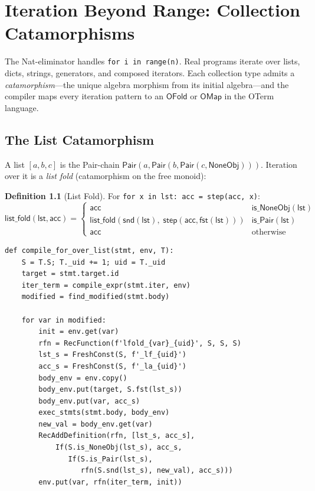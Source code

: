 \documentclass[11pt,a4paper]{report}
\theoremstyle{definition}
\newtheorem{definition}{Definition}[chapter]
\theoremstyle{plain}
\begin{document}
\chapter{Iteration Beyond Range: Collection Catamorphisms}
\label{ch:iteration-beyond}

The Nat-eliminator handles \texttt{for i in range(n)}.  Real programs
iterate over lists, dicts, strings, generators, and composed iterators.
Each collection type admits a \emph{catamorphism}---the unique algebra
morphism from its initial algebra---and the compiler maps every
iteration pattern to an $\mathsf{OFold}$ or $\mathsf{OMap}$ in the
OTerm language.

\section{The List Catamorphism}

A list $[a,b,c]$ is the Pair-chain $\mathsf{Pair}(a, \mathsf{Pair}(b,
\mathsf{Pair}(c, \mathsf{NoneObj})))$.  Iteration over it is a
\emph{list fold} (catamorphism on the free monoid):

\begin{definition}[List Fold]
\label{def:list-fold}
For \texttt{for x in lst: acc = step(acc, x)}:
\[
  \mathsf{list\_fold}(\mathsf{lst}, \mathsf{acc}) = \begin{cases}
    \mathsf{acc} & \mathsf{is\_NoneObj}(\mathsf{lst}) \\
    \mathsf{list\_fold}(\mathsf{snd}(\mathsf{lst}),\;
      \mathsf{step}(\mathsf{acc}, \mathsf{fst}(\mathsf{lst})))
      & \mathsf{is\_Pair}(\mathsf{lst}) \\
    \mathsf{acc} & \text{otherwise}
  \end{cases}
\]
\end{definition}

\begin{lstlisting}[caption={List fold Z3 RecFunction}]
def compile_for_over_list(stmt, env, T):
    S = T.S; T._uid += 1; uid = T._uid
    target = stmt.target.id
    iter_term = compile_expr(stmt.iter, env)
    modified = find_modified(stmt.body)

    for var in modified:
        init = env.get(var)
        rfn = RecFunction(f'lfold_{var}_{uid}', S, S, S)
        lst_s = FreshConst(S, f'_lf_{uid}')
        acc_s = FreshConst(S, f'_la_{uid}')
        body_env = env.copy()
        body_env.put(target, S.fst(lst_s))
        body_env.put(var, acc_s)
        exec_stmts(stmt.body, body_env)
        new_val = body_env.get(var)
        RecAddDefinition(rfn, [lst_s, acc_s],
            If(S.is_NoneObj(lst_s), acc_s,
               If(S.is_Pair(lst_s),
                  rfn(S.snd(lst_s), new_val), acc_s)))
        env.put(var, rfn(iter_term, init))
\end{lstlisting}
\end{document}
